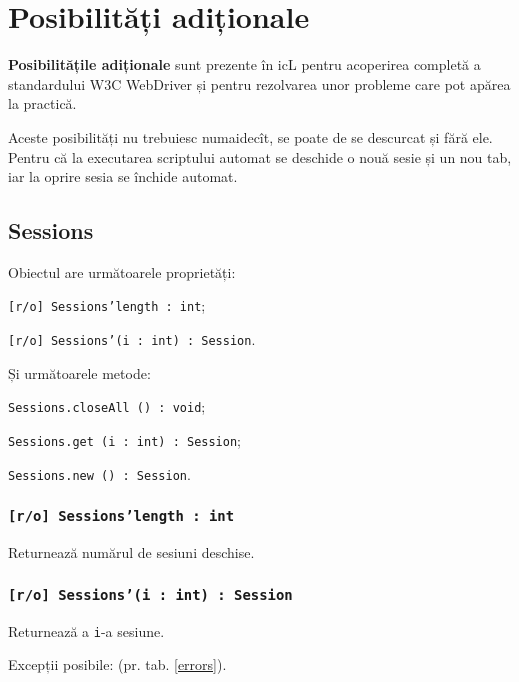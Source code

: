 

\section{Posibilități adiționale}

{\bf Posibilitățile adiționale} sunt prezente în icL pentru acoperirea completă a standardului W3C WebDriver și pentru rezolvarea unor probleme care pot apărea la practică.

Aceste posibilități nu trebuiesc numaidecît, se poate de se descurcat și fără ele. Pentru că la executarea scriptului automat se deschide o nouă sesie și un nou tab, iar la oprire sesia se închide automat.

\subsection{{\color{orange} Sessions}}

Obiectul \sessions{} are următoarele proprietăți:
\begin{icItems}
	\item \texttt{[r/o] Sessions'length : int};
	\item \texttt{[r/o] Sessions'(i : int) : Session}.
\end{icItems}

Și următoarele metode:
\begin{icItems}
	\item \texttt{Sessions.closeAll () : void};
	\item \texttt{Sessions.get (i : int) : Session};
	\item \texttt{Sessions.new () : Session}.
\end{icItems}

\subsubsection{\texttt{[r/o] Sessions'length : int}}

Returnează numărul de sesiuni deschise.

\subsubsection{\texttt{[r/o] Sessions'(i : int) : Session}}

Returnează a \texttt{i}-a sesiune.

Excepții posibile:  (pr. tab. \ref{errors}).

